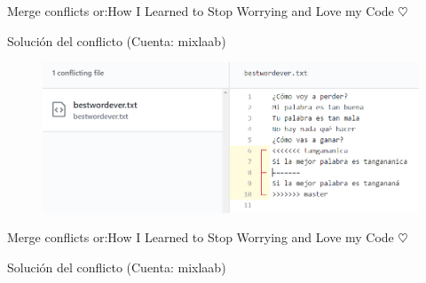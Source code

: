 \documentclass[10pt]{beamer}
\begin{document}
\begin{frame}{Merge conflicts or:}{How I Learned to Stop Worrying and Love my Code $\heartsuit$}

\begin{block}{Solución del conflicto (Cuenta: mixlaab)}

\begin{figure}[h!]
\centering
\includegraphics [scale=0.3]{conflict4}
\label{fig:issues}
\end{figure}
    
\end{block}

\end{frame}
\begin{frame}{Merge conflicts or:}{How I Learned to Stop Worrying and Love my Code $\heartsuit$}

\begin{block}{Solución del conflicto (Cuenta: mixlaab)}

\begin{columns}[c]
\column{1.9in}

\column{1.3in}
\vspace{0.1in}
\end{columns}

    
\end{block}

\end{frame}
\end{document}
